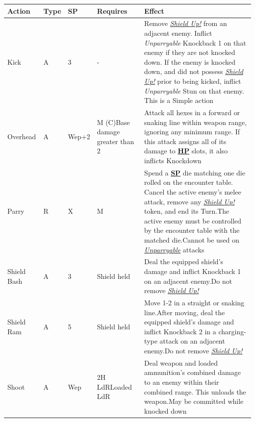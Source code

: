 \documentclass[12pt]{article}
\newcommand{\refto}[1]{\hyperlink{#1}{\textbf{#1}}}
\newcommand{\reftoit}[1]{\hyperlink{#1}{\emph{#1}}}
\begin{document}
\begin{center}
\begin{tabularx}{\textwidth}{p{}p{}p{}p{}p{}}
\hline
\rowcolor{white} \textbf{Action} & \textbf{Type} & \textbf{SP} & \textbf{Requires} & \textbf{Effect}\setcounter{rownum}{0}\\
\hline
Kick & A & 3 & - & Remove \reftoit{Shield Up!} from an adjacent enemy.\newline
Inflict \emph{Unparryable} Knockback 1 on that enemy if they are not knocked down.\newline
If the enemy is knocked down, and did not possess \reftoit{Shield Up!} prior to being kicked, inflict \emph{Unparryable} Stun on that enemy.\newline
This is a Simple action\\
Overhead & A & Wep+2 & M (C)\newline Base damage greater than 2 & Attack all hexes in a forward or snaking line within weapon range, ignoring any minimum range.\newline
If this attack assigns all of its damage to \refto{HP} slots, it also inflicts Knockdown\\
Parry & R & X & M & Spend a \refto{SP} die matching one die rolled on the encounter table. Cancel the active enemy’s melee attack, remove any \reftoit{Shield Up!} token, and end its Turn.\newline The active enemy must be controlled by the encounter table with the matched die.\newline Cannot be used on \reftoit{Unparryable} attacks\\
Shield Bash & A & 3 & Shield held & Deal the equipped shield’s damage and inflict Knockback 1 on an adjacent enemy.\newline Do not remove \reftoit{Shield Up!}\\
Shield Ram & A & 5 & Shield held & Move 1-2 in a straight or snaking line.\newline After moving, deal the equipped shield’s damage and inflict Knockback 2 in a charging-type attack on an adjacent enemy.\newline Do not remove \reftoit{Shield Up!}\\
Shoot & A & Wep & 2H LdR\newline Loaded LdR & Deal weapon and loaded ammunition’s combined damage to an enemy within their combined range. This unloads the weapon.\newline May be committed while knocked down\\

\end{tabularx}
\end{center}
\end{document}
